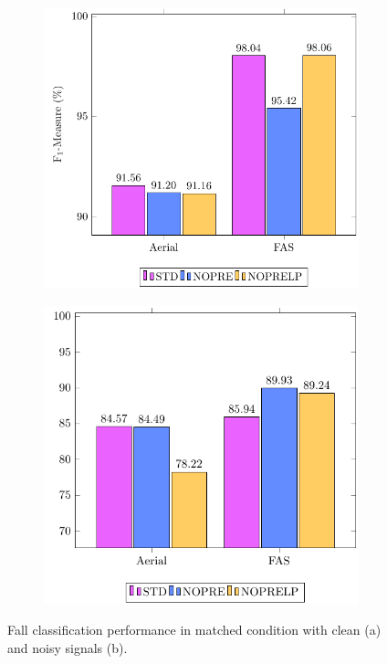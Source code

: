 \begin{figure}[t]
	\centering
	\begin{subfigure}[b]{0.75\textwidth}
		\includegraphics[width=\textwidth]{img/pgfsources/16_matched_clean/16_matched_CLEAN.pdf}
		\caption{}\label{fig:results_match_clean}
	\end{subfigure}
	\begin{subfigure}[b]{0.75\textwidth}
		\includegraphics[width=\textwidth]{img/pgfsources/16_matched_noisy/16_matched_NOISY.pdf}
		\caption{}\label{fig:results_match_noisy}
	\end{subfigure}
	\caption{Fall classification performance in matched condition with clean (a) and noisy signals (b).} \label{fig:results_match}
\end{figure}

